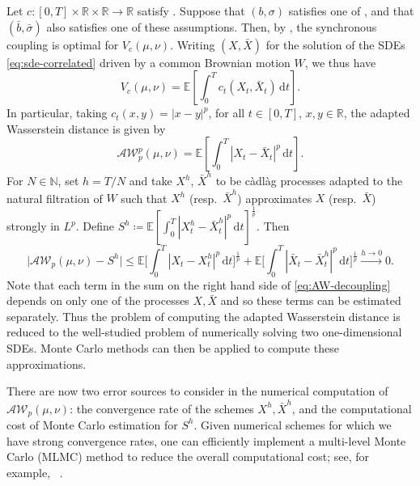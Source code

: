 \documentclass[onseside, final]{amsart}
\theoremstyle{definition}
\newcommand{\N}{\mathbb N}
\newcommand{\R}{\mathbb R}
\newcommand{\E}{\mathbb E}
\newcommand{\D}{\,\mathrm{d}}
\newcommand{\AW}{\mathcal A\mathcal W}
\numberwithin{equation}{section}
\begin{document}
		Let $c \colon [0, T] \times \R \times \R \to \R$ satisfy . Suppose that $(b, \sigma)$ satisfies one of , and that $(\bar b, \bar \sigma)$ also satisfies one of these assumptions. Then, by , the synchronous coupling is optimal for $V_c(\mu, \nu)$. Writing $(X, \bar X)$ for the solution of the SDEs \eqref{eq:sde-correlated} driven by a common Brownian motion $W$, we thus have
		\begin{equation}
			V_c(\mu, \nu) = \E\!\left[\int_0^T c_t(X_t, \bar X_t) \D t\right]\!.
		\end{equation}
		In particular, taking $c_t(x, y) = |x - y|^p$, for all $t \in [0, T]$, $x, y \in \R$, the adapted Wasserstein distance is given by
		\begin{equation}
			\AW_p^p(\mu, \nu) = \E\!\left[\int_0^T |X_t - \bar X_t|^p \D t\right]\!.
		\end{equation}
		For $N \in \N$, set $h = T/N$ and take $X^h$, $\bar X^h$ to be c\`adl\`ag processes adapted to the natural filtration of $W$ such that $X^h$ (resp.~$\bar X^h$) approximates $X$ (resp.~$\bar X$) strongly in $L^p$. Define $S^h \coloneqq \E[\int_0^T|X^h_t - \bar X^h_t|^p\D t]^{\frac 1p}$. Then
		\begin{equation}\label{eq:AW-decoupling}
			\bigl|\AW_p(\mu, \nu) - S^h\bigr| \leq \E\biggl[\int_0^T |X_t - X^h_t|^p \D t \biggr]^{\frac 1p} + \E\biggl[\int_0^T |\bar X_t - \bar X^h_t|^p \D t \biggr]^{\frac 1p} \xrightarrow{h \to 0} 0.
		\end{equation}
		Note that each term in the sum on the right hand side of \eqref{eq:AW-decoupling} depends on only one of the processes $X, \bar X$ and so these terms can be estimated separately. Thus the problem of computing the adapted Wasserstein distance is reduced to the well-studied problem of numerically solving two one-dimensional SDEs. Monte Carlo methods can then be applied to compute these approximations.
		
		There are now two error sources to consider in the numerical computation of $\AW_p(\mu, \nu)$: the convergence rate of the schemes $X^h, \bar X^h$, and the computational cost of Monte Carlo estimation for $S^h$. Given numerical schemes for which we have strong convergence rates, one can efficiently implement a multi-level Monte Carlo (MLMC) method to reduce the overall computational cost; see, for example, ~\citet{GiSz13}.
\end{document}
